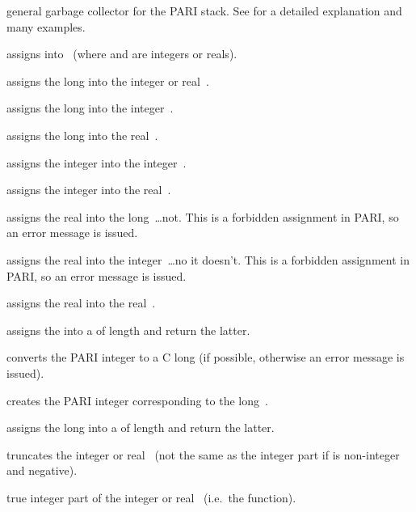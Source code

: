  general garbage collector
for the PARI stack. See  for a detailed explanation and
many examples.


 assigns  into~ (where
 and  are integers or reals).

 assigns the long  into the integer or
real~.

 assigns the long  into the
integer~.

 assigns the long  into the
real~.

 assigns the integer  into the
integer~.

 assigns the integer  into the
real~.

 assigns the real  into the
long~\dots not. This is a forbidden assignment in PARI, so an error
message is issued.

 assigns the real  into the
integer~\dots no it doesn't. This is a forbidden assignment in PARI,
so an error message is issued.

 assigns the real  into the real~.
\smallskip

 assigns the   into a
 of length  and return the latter.

 converts the PARI integer  to a C long (if
possible, otherwise an error message is issued).

 creates the PARI integer corresponding to the
long~.

 assigns the long  into a
 of length  and return the latter.

\smallskip

 truncates the integer or real~
(not the same as the integer part if  is non-integer and negative).

 true integer part of the integer or
real~ (i.e.~the  function).

